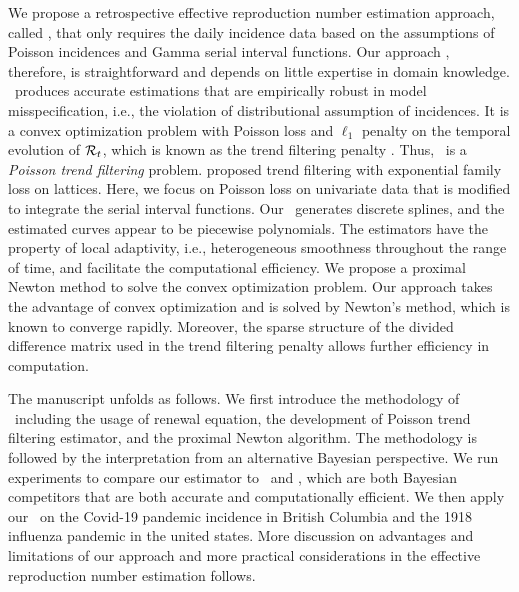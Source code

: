 We propose a retrospective effective reproduction number estimation approach, called \RtEstim, that only requires the daily incidence data based on the assumptions of Poisson incidences and Gamma serial interval functions. Our approach \RtEstim, therefore, is straightforward and depends on little expertise in domain knowledge. \RtEstim\ produces accurate estimations that are empirically robust in model misspecification, i.e., the violation of distributional assumption of incidences. 
% 
It is a convex optimization problem with Poisson loss and $\ell_1$ penalty on the temporal evolution of $\mathcal{R}_t$, which is known as the trend filtering penalty \citep{kim2009ell_1,tibshirani2014adaptive,sadhanala2022exponential}. Thus, \RtEstim\ is a \textit{Poisson trend filtering} problem. \cite{sadhanala2022exponential} proposed trend filtering with exponential family loss on lattices. Here, we focus on Poisson loss on univariate data that is modified to integrate the serial interval functions. Our \RtEstim\ generates discrete splines, and the estimated curves appear to be piecewise polynomials. The estimators have the property of local adaptivity, i.e., heterogeneous smoothness throughout the range of time, and facilitate the computational efficiency. %
We propose a proximal Newton method to solve the convex optimization problem. Our approach takes the advantage of convex optimization and is solved by Newton's method, which is known to converge rapidly. %
Moreover, the sparse structure of the divided difference matrix used in the trend filtering penalty allows further efficiency in computation. 

The manuscript unfolds as follows. We first introduce the methodology of \RtEstim\ including the usage of renewal equation, the development of Poisson trend filtering estimator, and the proximal Newton algorithm. The methodology is followed by the interpretation from an alternative Bayesian perspective. We run experiments to compare our estimator to \EpiEstim\ and \EpiLPS, which are both Bayesian competitors that are both accurate and computationally efficient. We then apply our \RtEstim\ on the Covid-19 pandemic incidence in British Columbia and the 1918 influenza pandemic in the united states. More discussion on advantages and limitations of our approach and more practical considerations in the effective reproduction number estimation follows. 
